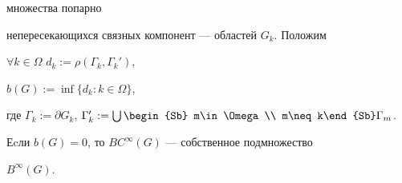множества попарно 


непересекающихся связных компонент --- областей $G_k$. Положим


$\forall k \in \Omega$ \; $d_k:=\rho(\Gamma_k, \Gamma_k')$,


$b(G):=\inf\{d_k: k\in \Omega\}$,


где $\Gamma_k:=\partial G_k$, $\Gamma_k^{\prime}:=\bigcup\limits


\begin{Sb} m\in \Omega \\ m\neq k\end{Sb}\Gamma_m$.








\begin{thm}


Еcли $b(G)=0$, то $BC^{\infty}(G)$ --- собственное подмножество


$B^\infty(G)$.


\end{thm}








